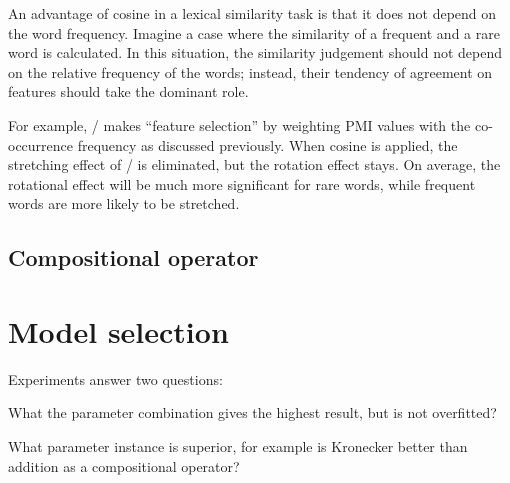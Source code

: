An advantage of cosine in a lexical similarity task is that it does not depend on the word frequency. Imagine a case where the similarity of a frequent and a rare word is calculated. In this situation, the similarity judgement should not depend on the relative frequency of the words; instead, their tendency of agreement on features should take the dominant role.

For example, \NPMI/ makes ``feature selection'' by weighting PMI values with the co-occurrence frequency as discussed previously. When cosine is applied, the stretching effect of \NPMI/ is eliminated, but the rotation effect stays. On average, the rotational effect will be much more significant for rare words, while frequent words are more likely to be stretched.

\subsection{Compositional operator}
\label{sec:comp-oper}


\section{Model selection}
\label{sec:model-select}

Experiments answer two questions:
\begin{compactitem}
\item What the parameter combination gives the highest result, but is not overfitted?
\item What parameter instance is superior, for example is Kronecker better than addition as a compositional operator?
\end{compactitem}


\cite{kiela-clark:2014:CVSC,lapesa2014large}


